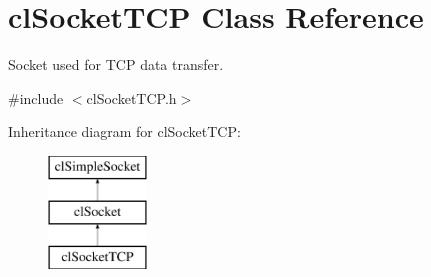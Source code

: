 \hypertarget{classcl_socket_t_c_p}{
\section{clSocketTCP Class Reference}
\label{classcl_socket_t_c_p}
}


Socket used for TCP data transfer.  




{\ttfamily \#include $<$clSocketTCP.h$>$}

Inheritance diagram for clSocketTCP:\begin{figure}[H]
\begin{center}
\leavevmode
\includegraphics[height=3.000000cm]{classcl_socket_t_c_p}
\end{center}
\end{figure}
